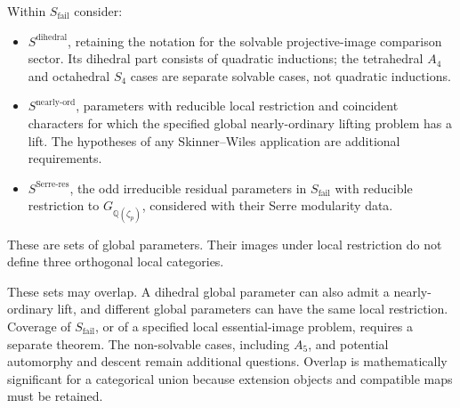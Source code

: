 \begin{definition}
\label{v4-arith:w6-e:def:non-TW-sectors}
Within $S_{\mathrm{fail}}$ consider:
\begin{itemize}
\item $S^{\mathrm{dihedral}}$, retaining the notation for
the solvable projective-image comparison sector. Its dihedral part
consists of quadratic inductions; the tetrahedral $A_4$ and octahedral
$S_4$ cases are separate solvable cases, not quadratic inductions.
\item $S^{\mathrm{nearly\text{-}ord}}$, parameters with reducible
local restriction and coincident characters for which the specified
global nearly-ordinary lifting problem has a lift. The hypotheses of
any Skinner--Wiles application are additional requirements.
\item $S^{\mathrm{Serre\text{-}res}}$, the odd irreducible residual
parameters in $S_{\mathrm{fail}}$ with reducible restriction to
$G_{\mathbb Q(\zeta_p)}$, considered with their Serre modularity data.
\end{itemize}
These are sets of global parameters. Their images under local
restriction do not define three orthogonal local categories.
\end{definition}
\begin{remark}
\label{v4-arith:w6-e:rem:non-TW-extent}
These sets may overlap. A dihedral global parameter can also admit a
nearly-ordinary lift, and different global parameters can have the
same local restriction. Coverage of $S_{\mathrm{fail}}$, or of a
specified local essential-image problem, requires a separate theorem.
The non-solvable cases, including $A_5$, and potential automorphy and
descent remain additional questions. Overlap is mathematically
significant for a categorical union because extension objects and
compatible maps must be retained.
\end{remark}

